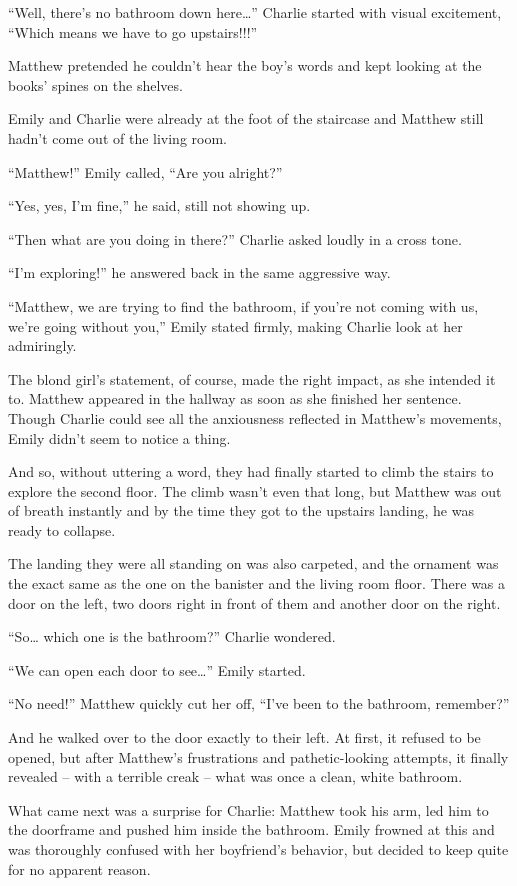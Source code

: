 “Well, there's no bathroom down here…” Charlie started with visual excitement, “Which means we have to go upstairs!!!”

Matthew pretended he couldn't hear the boy's words and kept looking at the books' spines on the shelves.

Emily and Charlie were already at the foot of the staircase and Matthew still hadn't come out of the living room.

“Matthew!” Emily called, “Are you alright?”

“Yes, yes, I'm fine,” he said, still not showing up.

“Then what are you doing in there?” Charlie asked loudly in a cross tone.

“I'm exploring!” he answered back in the same aggressive way.

“Matthew, we are trying to find the bathroom, if you're not coming with us, we're going without you,” Emily stated firmly, making Charlie look at her admiringly.

The blond girl's statement, of course, made the right impact, as she intended it to. Matthew appeared in the hallway as soon as she finished her sentence. Though Charlie could see all the anxiousness reflected in Matthew's movements, Emily didn't seem to notice a thing.

And so, without uttering a word, they had finally started to climb the stairs to explore the second floor. The climb wasn't even that long, but Matthew was out of breath instantly and by the time they got to the upstairs landing, he was ready to collapse.

The landing they were all standing on was also carpeted, and the ornament was the exact same as the one on the banister and the living room floor. There was a door on the left, two doors right in front of them and another door on the right.

“So… which one is the bathroom?” Charlie wondered.

“We can open each door to see…” Emily started.

“No need!” Matthew quickly cut her off, “I've been to the bathroom, remember?”

And he walked over to the door exactly to their left. At first, it refused to be opened, but after Matthew's frustrations and pathetic-looking attempts, it finally revealed – with a terrible creak – what was once a clean, white bathroom.

What came next was a surprise for Charlie: Matthew took his arm, led him to the doorframe and pushed him inside the bathroom. Emily frowned at this and was thoroughly confused with her boyfriend's behavior, but decided to keep quite for no apparent reason.

